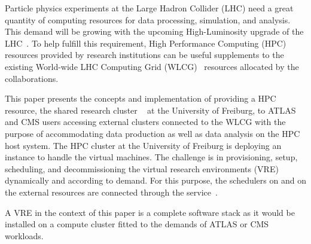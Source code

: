 Particle physics experiments at the Large Hadron Collider (LHC) need a
great quantity of computing resources for data processing, simulation, and analysis.
This demand will be growing with the upcoming High-Luminosity upgrade of the LHC~\cite{HLLHCcompneeds}.
To help fulfill this requirement, High Performance Computing (HPC) resources provided by research institutions
can be useful supplements to the existing World-wide LHC Computing
Grid (WLCG)~\cite{wlcg} resources
allocated by the collaborations.


This paper presents the concepts and implementation of providing a HPC resource, the
shared research cluster \NEMO~\cite{nemo} at the University of Freiburg, to ATLAS and CMS users accessing external clusters connected to the WLCG with the purpose of accommodating data production as well as
data analysis on the HPC host system. The HPC cluster \NEMO at
the University of Freiburg is deploying an \Openstack~\cite{Openstack} instance to handle the
virtual machines. The challenge is in provisioning, setup, scheduling, and decommissioning the virtual research environments (VRE) dynamically and according to demand. For this purpose, the schedulers on \NEMO and on the external resources are
connected through the \Roced service~\cite{ROCED}.

A VRE in the context of this paper is a complete software stack
as it would be installed on a compute cluster fitted to the demands of ATLAS or CMS workloads.
